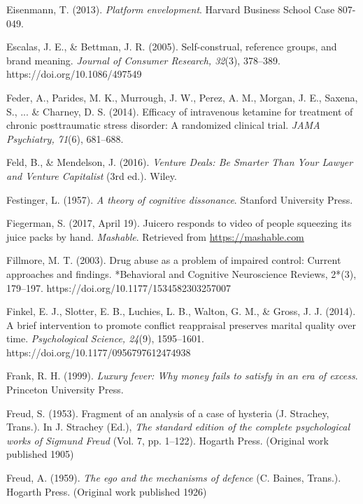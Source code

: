 \begin{thebibliography}{}
    Eisenmann, T. (2013). \textit{Platform envelopment}. Harvard Business School Case 807-049.

    Escalas, J. E., \& Bettman, J. R. (2005). Self-construal, reference groups, and brand meaning. \textit{Journal of Consumer Research, 32}(3), 378--389. https://doi.org/10.1086/497549


    Feder, A., Parides, M. K., Murrough, J. W., Perez, A. M., Morgan, J. E., Saxena, S., ... \& Charney, D. S. (2014). Efficacy of intravenous ketamine for treatment of chronic posttraumatic stress disorder: A randomized clinical trial. \textit{JAMA Psychiatry, 71}(6), 681–688.

    Feld, B., \& Mendelson, J. (2016). \textit{Venture Deals: Be Smarter Than Your Lawyer and Venture Capitalist} (3rd ed.). Wiley.
    
    Festinger, L. (1957). \textit{A theory of cognitive dissonance}. Stanford University Press.

    Fiegerman, S. (2017, April 19). Juicero responds to video of people squeezing its juice packs by hand. \textit{Mashable}. Retrieved from \url{https://mashable.com}

    Fillmore, M. T. (2003). Drug abuse as a problem of impaired control: Current approaches and findings. *Behavioral and Cognitive Neuroscience Reviews, 2*(3), 179–197. https://doi.org/10.1177/1534582303257007

    Finkel, E. J., Slotter, E. B., Luchies, L. B., Walton, G. M., \& Gross, J. J. (2014). A brief intervention to promote conflict reappraisal preserves marital quality over time. \textit{Psychological Science, 24}(9), 1595–1601. https://doi.org/10.1177/0956797612474938

    Frank, R. H. (1999). \textit{Luxury fever: Why money fails to satisfy in an era of excess}. Princeton University Press.

    Freud, S. (1953). Fragment of an analysis of a case of hysteria (J. Strachey, Trans.). In J. Strachey (Ed.), \textit{The standard edition of the complete psychological works of Sigmund Freud} (Vol. 7, pp. 1–122). Hogarth Press. (Original work published 1905)

    Freud, A. (1959). \textit{The ego and the mechanisms of defence} (C. Baines, Trans.). Hogarth Press. (Original work published 1926)


\end{thebibliography}
